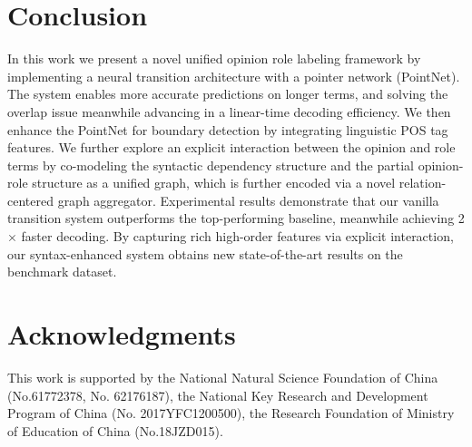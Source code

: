 \documentclass[letterpaper]{article} \usepackage{aaai22}  \usepackage{times}  \usepackage{helvet}  \usepackage{courier}  \usepackage[hyphens]{url}  \usepackage{graphicx} \urlstyle{rm} \def\UrlFont{\rm}  \usepackage{natbib}  \usepackage{caption} \DeclareCaptionStyle{ruled}{labelfont=normalfont,labelsep=colon,strut=off} \frenchspacing  \setlength{\pdfpagewidth}{8.5in}  \setlength{\pdfpageheight}{11in}  \usepackage{algorithm}
\begin{document}
\section{Conclusion}


In this work we present a novel unified opinion role labeling framework by implementing a neural transition architecture with a pointer network (PointNet).
The system enables more accurate predictions on longer terms, and solving the overlap issue meanwhile advancing in a linear-time decoding efficiency.
We then enhance the PointNet for boundary detection by integrating linguistic POS tag features.
We further explore an explicit interaction between the opinion and role terms by co-modeling the syntactic dependency structure and the partial opinion-role structure as a unified graph, which is further encoded via a novel relation-centered graph aggregator.
Experimental results demonstrate that our vanilla transition system outperforms the top-performing baseline, meanwhile achieving 2$\times$ faster decoding.
By capturing rich high-order features via explicit interaction, our syntax-enhanced system obtains new state-of-the-art results on the benchmark dataset.










\newpage

\section*{Acknowledgments}

This work is supported by the National Natural Science Foundation of China (No.61772378, No. 62176187), 
the National Key Research and Development Program of China (No. 2017YFC1200500), 
the Research Foundation of Ministry of Education of China (No.18JZD015).









\end{document}
